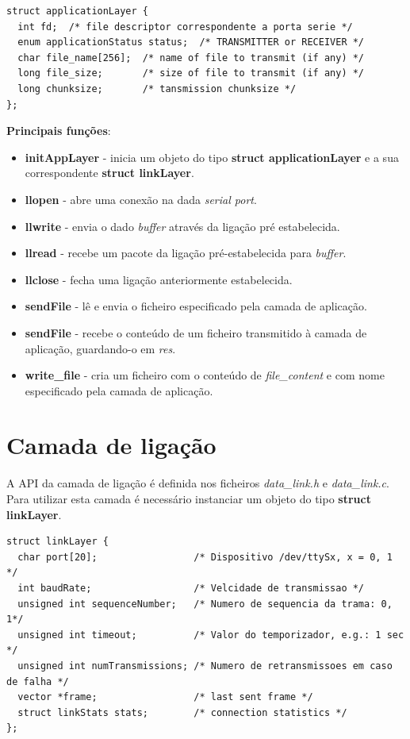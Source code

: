 \documentclass[11pt]{report}
\begin{document}
\begin{lstlisting}
struct applicationLayer {
  int fd;  /* file descriptor correspondente a porta serie */
  enum applicationStatus status;  /* TRANSMITTER or RECEIVER */
  char file_name[256];  /* name of file to transmit (if any) */
  long file_size;       /* size of file to transmit (if any) */
  long chunksize;       /* tansmission chunksize */
};
\end{lstlisting}

\textbf{Principais funções}:
\begin{itemize}
\item \textbf{initAppLayer} - inicia um objeto do tipo \textbf{struct applicationLayer}
e a sua correspondente \textbf{struct linkLayer}.
\item \textbf{llopen} - abre uma conexão na dada \textit{serial port}.
\item \textbf{llwrite} - envia o dado \textit{buffer} através da ligação pré estabelecida.
\item \textbf{llread} - recebe um pacote da ligação pré-estabelecida para \textit{buffer}.
\item \textbf{llclose} - fecha uma ligação anteriormente estabelecida.
\item \textbf{sendFile} - lê e envia o ficheiro especificado pela camada de aplicação.
\item \textbf{sendFile} - recebe o conteúdo de um ficheiro transmitido à camada de aplicação,
guardando-o em \textit{res}.
\item \textbf{write\_file} - cria um ficheiro com o conteúdo de \textit{file\_content}
e com nome especificado pela camada de aplicação.
\end{itemize}

\section{Camada de ligação}

A API da camada de ligação é definida nos ficheiros \textit{data\_link.h} e
\textit{data\_link.c}. Para utilizar esta camada é necessário instanciar um objeto
do tipo \textbf{struct linkLayer}.

\begin{lstlisting}
struct linkLayer {
  char port[20];                 /* Dispositivo /dev/ttySx, x = 0, 1 */
  int baudRate;                  /* Velcidade de transmissao */
  unsigned int sequenceNumber;   /* Numero de sequencia da trama: 0, 1*/
  unsigned int timeout;          /* Valor do temporizador, e.g.: 1 sec */
  unsigned int numTransmissions; /* Numero de retransmissoes em caso de falha */
  vector *frame;                 /* last sent frame */
  struct linkStats stats;        /* connection statistics */
};
\end{lstlisting}
\end{document}
